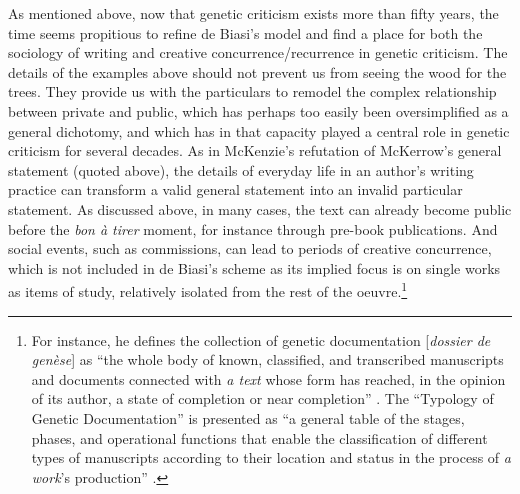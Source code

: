 \begin{paper}
As mentioned above, now that genetic criticism exists more than fifty
years, the time seems propitious to refine de Biasi's model and find a
place for both the sociology of writing and creative
concurrence/recurrence in genetic criticism. The details of the examples
above should not prevent us from seeing the wood for the trees. They
provide us with the particulars to remodel the complex relationship
between private and public, which has perhaps too easily been
oversimplified as a general dichotomy, and which has in that capacity
played a central role in genetic criticism for several decades. As in
McKenzie's refutation of McKerrow's general statement (quoted above),
the details of everyday life in an author's writing practice can
transform a valid general statement into an invalid particular
statement. As discussed above, in many cases, the text can already
become public before the \emph{bon à tirer} moment, for instance through
pre-book publications. And social events, such as commissions, can lead
to periods of creative concurrence, which is not included in de Biasi's
scheme as its implied focus is on single works as items of study,
relatively isolated from the rest of the oeuvre.\footnote{For instance,
  he defines the collection of genetic documentation {[}\emph{dossier de
  genèse}{]} as ``the whole body of known, classified, and transcribed
  manuscripts and documents connected with \emph{a text} whose form has
  reached, in the opinion of its author, a state of completion or near
  completion'' \citep[31; emphasis added]{biasi_what_1996}. The ``Typology of
  Genetic Documentation'' is presented as ``a general table of the
  stages, phases, and operational functions that enable the
  classification of different types of manuscripts according to their
  location and status in the process of \emph{a work}'s production''
  \citep[32; emphasis added]{biasi_what_1996}.}


\end{paper}
